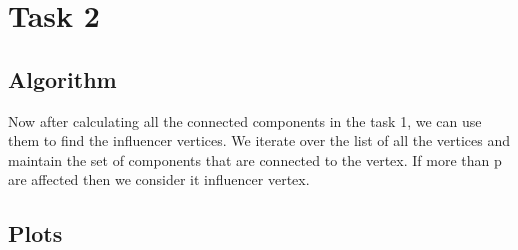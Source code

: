 \documentclass{article}
\begin{document}
\newpage
\section{Task 2}

\subsection{Algorithm}
Now after calculating all the connected components in the task 1, we can use them to find the influencer vertices. We iterate over the list of all the vertices and maintain the set of components that are connected to the vertex. If more than p are affected then we consider it influencer vertex.

\subsection{Plots}
\end{document}
